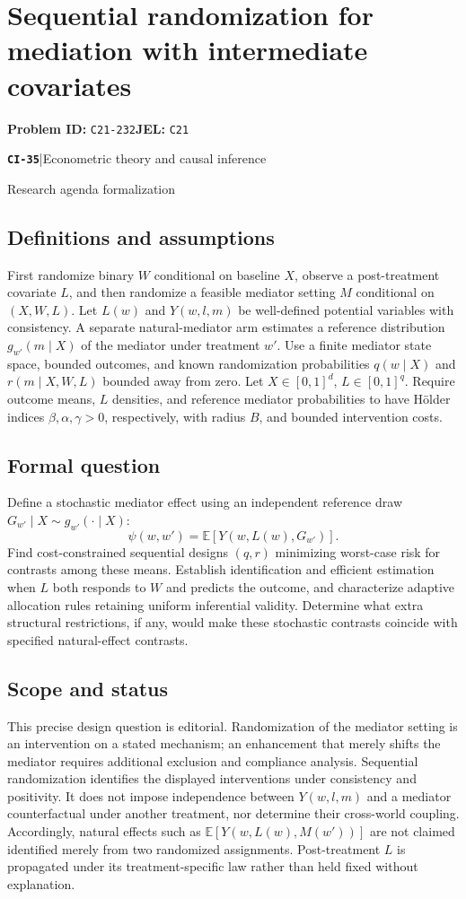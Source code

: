\documentclass[11pt,a4paper]{article}
\newcommand{\E}{\mathbb E}
\newcommand{\entrymeta}[3]{{\sffamily\small\color{muted}\textbf{\texttt{#1}}\quad|\quad #2\par #3\par}}
\begin{document}
\section*{Sequential randomization for mediation with intermediate covariates}
\textbf{Problem ID:} \texttt{C21-232}\quad \textbf{JEL:} \texttt{C21}\par
\label{problem:OP-0514}
\label{beyond:CI-35}
\entrymeta{CI-35}{Econometric theory and causal inference}{Research agenda formalization}
\subsection*{Definitions and assumptions}
First randomize binary $W$ conditional on baseline $X$, observe a post-treatment covariate $L$, and then randomize a feasible mediator setting $M$ conditional on $(X,W,L)$. Let $L(w)$ and $Y(w,l,m)$ be well-defined potential variables with consistency. A separate natural-mediator arm estimates a reference distribution $g_{w'}(m\mid X)$ of the mediator under treatment $w'$. Use a finite mediator state space, bounded outcomes, and known randomization probabilities $q(w\mid X)$ and $r(m\mid X,W,L)$ bounded away from zero. Let $X\in[0,1]^d$, $L\in[0,1]^q$. Require outcome means, $L$ densities, and reference mediator probabilities to have H\"older indices $\beta,\alpha,\gamma>0$, respectively, with radius $B$, and bounded intervention costs.
\subsection*{Formal question}
Define a stochastic mediator effect using an independent reference draw $G_{w'}\mid X\sim g_{w'}(\cdot\mid X)$:
\[
 \psi(w,w')=\E[Y(w,L(w),G_{w'})].
\]
Find cost-constrained sequential designs $(q,r)$ minimizing worst-case risk for contrasts among these means. Establish identification and efficient estimation when $L$ both responds to $W$ and predicts the outcome, and characterize adaptive allocation rules retaining uniform inferential validity. Determine what extra structural restrictions, if any, would make these stochastic contrasts coincide with specified natural-effect contrasts.
\subsection*{Scope and status}
This precise design question is editorial. Randomization of the mediator setting is an intervention on a stated mechanism; an enhancement that merely shifts the mediator requires additional exclusion and compliance analysis. Sequential randomization identifies the displayed interventions under consistency and positivity. It does not impose independence between $Y(w,l,m)$ and a mediator counterfactual under another treatment, nor determine their cross-world coupling. Accordingly, natural effects such as $\E[Y(w,L(w),M(w'))]$ are not claimed identified merely from two randomized assignments. Post-treatment $L$ is propagated under its treatment-specific law rather than held fixed without explanation.
\end{document}
